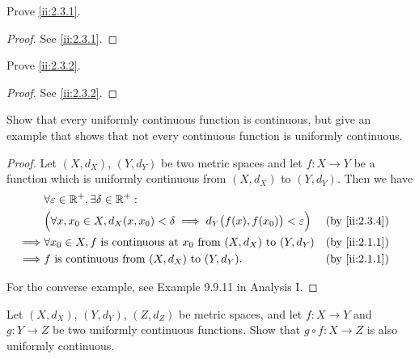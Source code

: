 \exercisesection

\begin{ex}\label{ii:ex:2.3.1}
  Prove \cref{ii:2.3.1}.
\end{ex}

\begin{proof}
  See \cref{ii:2.3.1}.
\end{proof}

\begin{ex}\label{ii:ex:2.3.2}
  Prove \cref{ii:2.3.2}.
\end{ex}

\begin{proof}
  See \cref{ii:2.3.2}.
\end{proof}

\begin{ex}\label{ii:ex:2.3.3}
  Show that every uniformly continuous function is continuous, but give an example that shows that not every continuous function is uniformly continuous.
\end{ex}

\begin{proof}
  Let \((X, d_X)\), \((Y, d_Y)\) be two metric spaces and let \(f : X \to Y\) be a function which is uniformly continuous from \((X, d_X)\) to \((Y, d_Y)\).
  Then we have
  \begin{align*}
             & \forall \varepsilon \in \R^+, \exists \delta \in \R^+ :                                                                  \\
             & \Big(\forall x, x_0 \in X, d_X(x, x_0) < \delta \implies d_Y\big(f(x), f(x_0)\big) < \varepsilon\Big) &  & \by{ii:2.3.4} \\
    \implies & \forall x_0 \in X, f \text{ is continuous at } x_0 \text{ from } (X, d_X) \text{ to } (Y, d_Y)        &  & \by{ii:2.1.1} \\
    \implies & f \text{ is continuous from } (X, d_X) \text{ to } (Y, d_Y).                                          &  & \by{ii:2.1.1}
  \end{align*}

  For the converse example, see Example 9.9.11 in Analysis I.
\end{proof}

\begin{ex}\label{ii:ex:2.3.4}
  Let \((X, d_X)\), \((Y, d_Y)\), \((Z, d_Z)\) be metric spaces, and let \(f : X \to Y\) and \(g : Y \to Z\) be two uniformly continuous functions.
  Show that \(g \circ f : X \to Z\) is also uniformly continuous.
\end{ex}

